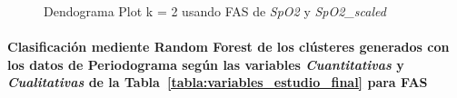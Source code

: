 \begin{figure}[ht]
    \centering
    \hfill
    \caption{Dendograma Plot k = 2 usando FAS de \textit{SpO2} y \textit{SpO2\_scaled}}\label{fig:acf_ctg_spo2}
\end{figure}

\paragraph{Clasificación mediente Random Forest de los clústeres generados con los datos de Periodograma según las variables \textit{Cuantitativas} y \textit{Cualitativas} de la Tabla~\ref{tabla:variables_estudio_final} para FAS}

